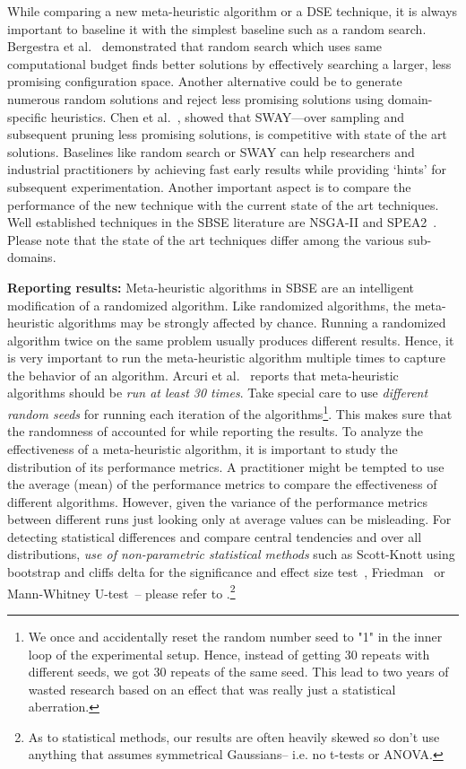 \documentclass[sigconf,anonymous,review]{acmart}
\begin{document}
While comparing a new meta-heuristic algorithm or a DSE technique, it is always important to baseline it with the simplest baseline such as a random search. Bergestra et al.~\cite{bergstra2012random} demonstrated that random search which uses same computational budget finds better solutions by effectively searching a larger, less promising configuration space. Another alternative could be to generate numerous random solutions and reject less promising solutions using domain-specific heuristics. Chen et al.~\cite{chen2017sampling}, showed that SWAY---over sampling and subsequent pruning less promising solutions, is competitive with state of the art solutions. Baselines like random search or SWAY can help researchers and industrial practitioners by achieving fast early results while providing `hints' for subsequent experimentation.
Another important aspect is to compare the performance of the new technique with the current state of the art techniques. Well established techniques in the SBSE literature are NSGA-II and SPEA2~\cite{chen2017beyond}. Please note that the state of the art techniques differ among the various sub-domains.

  \noindent\textbf{Reporting results: }
Meta-heuristic algorithms in SBSE are an intelligent modification of a randomized algorithm. Like randomized algorithms, the meta-heuristic algorithms may be strongly affected by chance. Running a randomized
algorithm twice on the same problem usually produces different results. Hence, it is very important to run the meta-heuristic algorithm multiple times to capture the behavior of an algorithm. Arcuri et al.~\cite{arcuri2011practical} reports that meta-heuristic algorithms should be \textit{run at least 30 times}. Take special care to use \textit{different random seeds} for running each iteration of the algorithms\footnote{We once and accidentally reset the random number seed to "1" in the inner loop of the experimental setup. Hence,  instead of getting 30 repeats with different seeds, we got 30 repeats of the same seed. This lead to two years of wasted research based
on an effect that was really just a statistical aberration.}. This makes sure that the randomness of accounted for while reporting the results. 
To analyze the effectiveness of a meta-heuristic algorithm, it is important to study the distribution of its performance metrics. A practitioner might be tempted to use the average (mean) of the performance metrics to compare the effectiveness of different algorithms. However, given the variance of the performance metrics between different runs just looking only at average values can be misleading. For detecting statistical differences and compare central tendencies and over all distributions, \textit{use of non-parametric statistical methods} such as Scott-Knott using bootstrap and cliffs delta for the significance and effect size test~\cite{mittas2013ranking, ghotra2015revisiting}, Friedman~\cite{lessmann2008benchmarking} or Mann-Whitney U-test~\cite{arcuri2011practical}-- please refer to \cite{arcuri2011practical, arcuri2014hitchhiker}.\footnote{
As to statistical methods, our results are often heavily skewed so don't use anything that assumes symmetrical Gaussians-- i.e.   no t-tests or ANOVA.}
\end{document}
